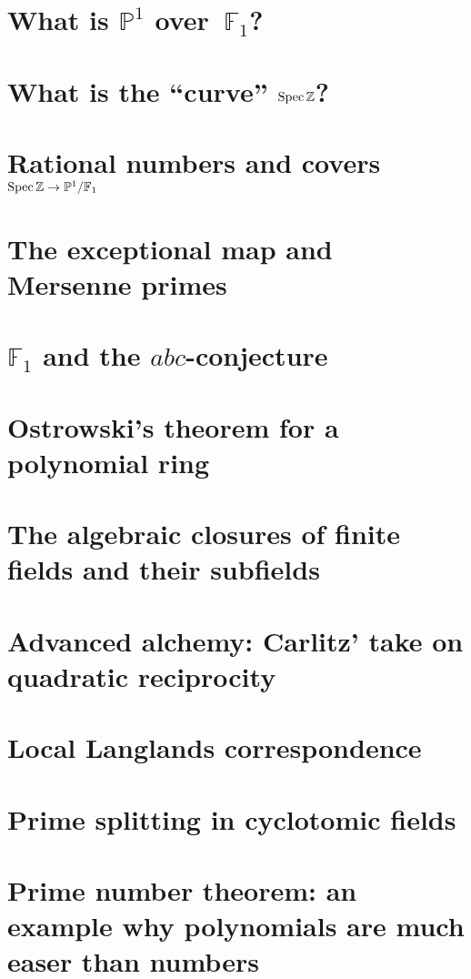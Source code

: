 \documentclass[a4paper]{memoir}
\begin{document}
\section{What is $\mathbb{P}^1$ over~$\mathbb{F}_1$?}

\section{What is the ``curve'' $\operatorname{Spec}\mathbb{Z}$?}

\section{Rational numbers and covers $\operatorname{Spec}\mathbb{Z}\to\mathbb{P}^1/\mathbb{F}_1$}

\section{The exceptional map and Mersenne primes}

\section{$\mathbb{F}_1$ and the $abc$-conjecture}

\section{Ostrowski's theorem for a polynomial ring}

\section{The algebraic closures of finite fields and their subfields}

\section{Advanced alchemy: Carlitz' take on quadratic reciprocity}

\section{Local Langlands correspondence}

\section{Prime splitting in cyclotomic fields}

\section{Prime number theorem: an example why polynomials are much easer than numbers}



\end{document}
